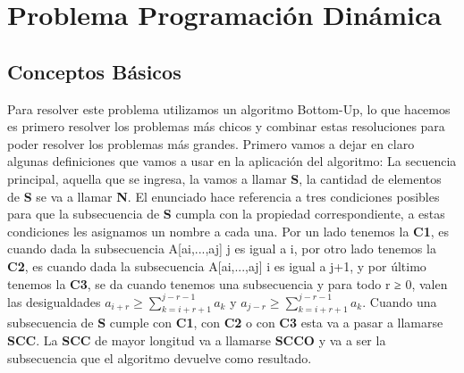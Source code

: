 \documentclass[10pt]{article}
\begin{document}
	\section*{\LARGE Problema Programaci\'on Din\'amica}
	\subsection*{Conceptos B\'asicos}
	Para resolver este problema utilizamos un algoritmo Bottom-Up, lo que hacemos es primero resolver los problemas m\'as chicos y combinar estas resoluciones para poder resolver los problemas m\'as grandes. Primero vamos a dejar en claro algunas definiciones que vamos a usar en la aplicaci\'on del algoritmo:
La secuencia principal, aquella que se ingresa, la vamos a llamar \textbf{S}, la cantidad de elementos de \textbf{S} se va a llamar \textbf{N}.
El enunciado hace referencia a tres condiciones posibles para que la subsecuencia de \textbf{S} cumpla con la propiedad correspondiente, a estas condiciones les asignamos un nombre a cada una. Por un lado tenemos la \textbf{C1}, es cuando dada la subsecuencia A[ai,...,aj] j es igual a i, por otro lado tenemos la \textbf{C2}, es cuando dada la subsecuencia A[ai,...,aj] i es igual a j+1, y por \'ultimo tenemos la \textbf{C3}, se da cuando tenemos una subsecuencia y para todo r ≥ 0, valen las desigualdades $a_{i+r} \geq \sum_{k=i+r+1}^{j-r-1}a_k $ y $ a_{j-r} \geq \sum_{k=i+r+1}^{j-r-1}a_k$.
Cuando una subsecuencia de \textbf{S} cumple con \textbf{C1}, con \textbf{C2} o con \textbf{C3} esta va a  pasar a llamarse \textbf{SCC}. La \textbf{SCC} de mayor longitud va a llamarse \textbf{SCCO} y va a ser la subsecuencia que el algoritmo devuelve como resultado.
\end{document}
